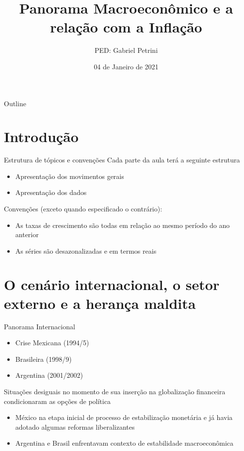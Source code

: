 \documentclass[presentation]{beamer}
\author{PED: Gabriel Petrini}
\date{04 de Janeiro de 2021}
\title{Panorama Macroeconômico e a relação com a Inflação}
\begin{document}
\maketitle
\begin{frame}{Outline}
\tableofcontents
\end{frame}




\section{Introdução}
\label{sec:org09677a8}

\begin{frame}[label={sec:orgfa047db}]{Estrutura de tópicos e convenções}
Cada parte da aula terá a seguinte estrutura

\begin{itemize}
\item Apresentação dos movimentos gerais
\item Apresentação dos dados
\end{itemize}

\alert{Convenções (exceto quando especificado o contrário):}
\begin{itemize}
\item As taxas de crescimento são todas em relação ao mesmo período do ano anterior
\item As séries são desazonalizadas e em termos reais
\end{itemize}
\end{frame}

\section{O cenário internacional, o setor externo e a herança maldita}
\label{sec:orgab5bd38}

\begin{frame}[label={sec:orgc896728}]{Panorama Internacional}
\begin{itemize}
\item Crise Mexicana (1994/5)
\item Brasileira (1998/9)
\item Argentina (2001/2002)
\end{itemize}

Situações desiguais no momento de sua inserção na globalização financeira condicionaram as opções de política

\begin{itemize}
\item México na etapa inicial de processo de estabilização monetária e já havia adotado algumas reformas liberalizantes
\item Argentina e Brasil enfrentavam contexto de estabilidade macroeconômica
\end{itemize}
\end{frame}
\end{document}
